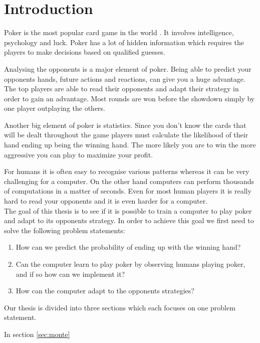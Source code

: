 \section*{Introduction}
Poker is the most popular card game in the world \cite{poker-popular}. It involves intelligence, psychology and luck. Poker has a lot of hidden information which requires the players to make decisions based on qualified guesses.  

Analysing the opponents is a major element of poker. Being able to predict your opponents hands, future actions and reactions, can give you a huge advantage. The top players are able to read their opponents and adapt their strategy in order to gain an advantage. Most rounds are won before the showdown simply by one player outplaying the others. 

Another big element of poker is statistics. Since you don't know the cards that will be dealt throughout the game players must calculate the likelihood of their hand ending up being the winning hand. The more likely you are to win the more aggressive you can play to maximize your profit. 

For humans it is often easy to recognise various patterns whereas it can be very challenging for a computer. On the other hand computers can perform thousands of computations in a matter of seconds. Even for most human players it is really hard to read your opponents and it is even harder for a computer.\\

The goal of this thesis is to see if it is possible to train a computer to play poker and adapt to its opponents strategy. In order to achieve this goal we first need to solve the following problem statements:

\begin{enumerate}
  \item \label{itm:q1} How can we predict the probability of ending up with the winning hand? 
  \item \label{itm:q2} Can the computer learn to play poker by observing humans playing poker, and if so how can we implement it? 
  \item \label{itm:q3} How can the computer adapt to the opponents strategies?
\end{enumerate}

Our thesis is divided into three sections which each focuses on one problem statement.

In section \ref{sec:monte}